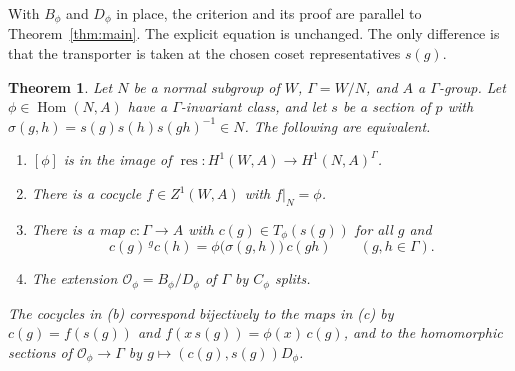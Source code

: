 \documentclass[12pt,letterpaper]{article}
\numberwithin{equation}{section}
\theoremstyle{plain}
\newtheorem{theorem}{Theorem}[section]
\theoremstyle{definition}
\newcommand{\act}[2]{{}^{#1}\!#2}          %
\DeclareMathOperator{\Hom}{Hom}
\DeclareMathOperator{\res}{res}
\begin{document}
With $B_\phi$ and $D_\phi$ in place, the criterion and its proof are
parallel to Theorem~\ref{thm:main}. The explicit equation is unchanged.
The only difference is that the transporter is taken at the chosen coset
representatives $s(g)$.

\begin{theorem}\label{thm:general}
Let $N$ be a normal subgroup of $W$, $\Gamma=W/N$, and $A$ a
$\Gamma$-group. Let $\phi\in\Hom(N,A)$ have a $\Gamma$-invariant class,
and let $s$ be a section of $p$ with
$\sigma(g,h)=s(g)s(h)s(gh)^{-1}\in N$. The following are equivalent.
\begin{enumerate}[label=\textup{(\alph*)},itemsep=1pt]
\item $[\phi]$ is in the image of $\res:H^1(W,A)\to H^1(N,A)^\Gamma$.
\item There is a cocycle $f\in Z^1(W,A)$ with $f|_N=\phi$.
\item There is a map $c:\Gamma\to A$ with $c(g)\in T_\phi(s(g))$ for all
$g$ and
\begin{equation}\label{eq:cgen}
c(g)\,\act{g}{c(h)}=\phi\bigl(\sigma(g,h)\bigr)\,c(gh)\qquad(g,h\in\Gamma).
\end{equation}
\item The extension $\mathcal{O}_\phi=B_\phi/D_\phi$ of $\Gamma$ by
$C_\phi$ splits.
\end{enumerate}
The cocycles in \textup{(b)} correspond bijectively to the maps in
\textup{(c)} by $c(g)=f(s(g))$ and $f(x\,s(g))=\phi(x)\,c(g)$, and to the
homomorphic sections of $\mathcal{O}_\phi\to\Gamma$ by
$g\mapsto(c(g),s(g))D_\phi$.
\end{theorem}
\end{document}
